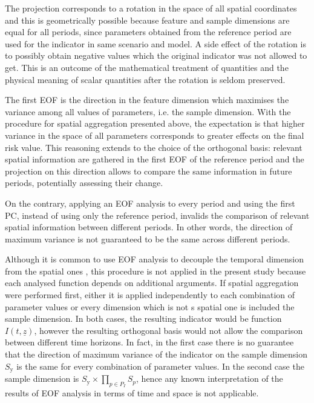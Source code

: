 The projection corresponds to a rotation in the space of all spatial coordinates and this is geometrically possible because feature and sample dimensions are equal for all periods, since parameters obtained from the reference period are used for the indicator in same scenario and model. A side effect of the rotation is to possibly obtain negative values which the original indicator was not allowed to get. This is an outcome of the mathematical treatment of quantities and the physical meaning of scalar quantities after the rotation is seldom preserved.

The first \gls{EOF} is the direction in the feature dimension which maximises the variance among all values of parameters, i.e. the sample dimension. With the procedure for spatial aggregation presented above, the expectation is that higher variance in the space of all parameters corresponds to greater effects on the final \gls{risk} value. This reasoning extends to the choice of the orthogonal basis: relevant spatial information are gathered in the first \gls{EOF} of the reference period and the projection on this direction allows to compare the same information in future periods, potentially assessing their change.

On the contrary, applying an \gls{EOF} analysis to every period and using the first \gls{PC}, instead of using only the reference period, invalids the comparison of relevant spatial information between different periods. In other words, the direction of maximum variance is not guaranteed to be the same across different periods.

Although it is common to use \gls{EOF} analysis to decouple the temporal dimension from the spatial ones \cite{2007HannachiEmpiricalOrthogonal}, this procedure is not applied in the present study because each analysed function depends on additional arguments. If spatial aggregation were performed first, either it is applied independently to each combination of parameter values or every dimension which is not s spatial one is included the sample dimension. In both cases, the resulting \gls{indicator} would be function $I(t, \underline{z})$, however the resulting orthogonal basis would not allow the comparison between different time horizons. In fact, in the first case there is no guarantee that the direction of maximum variance of the indicator on the sample dimension $S_\text{y}$ is the same for every combination of parameter values. In the second case the sample dimension is $S_\text{y} \times \prod_{p \in P_I} S_p$, hence any known interpretation of the results of \gls{EOF} analysis in terms of time and space is not applicable.

